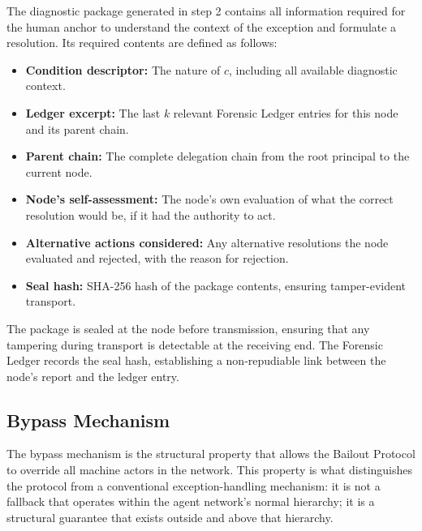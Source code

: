 \bigskip
The diagnostic package generated in step 2 contains all information required for the human anchor to understand the context of the exception and formulate a resolution. Its required contents are defined as follows:

\begin{itemize}
\item \textbf{Condition descriptor:} The nature of $c$, including all available diagnostic context.
\item \textbf{Ledger excerpt:} The last $k$ relevant Forensic Ledger entries for this node and its parent chain.
\item \textbf{Parent chain:} The complete delegation chain from the root principal to the current node.
\item \textbf{Node's self-assessment:} The node's own evaluation of what the correct resolution would be, if it had the authority to act.
\item \textbf{Alternative actions considered:} Any alternative resolutions the node evaluated and rejected, with the reason for rejection.
\item \textbf{Seal hash:} SHA-256 hash of the package contents, ensuring tamper-evident transport.
\end{itemize}

The package is sealed at the node before transmission, ensuring that any tampering during transport is detectable at the receiving end. The Forensic Ledger records the seal hash, establishing a non-repudiable link between the node's report and the ledger entry.

\subsection{Bypass Mechanism}
\label{sec:bypass}

The bypass mechanism is the structural property that allows the Bailout Protocol to override all machine actors in the network. This property is what distinguishes the protocol from a conventional exception-handling mechanism: it is not a fallback that operates within the agent network's normal hierarchy; it is a structural guarantee that exists outside and above that hierarchy.

